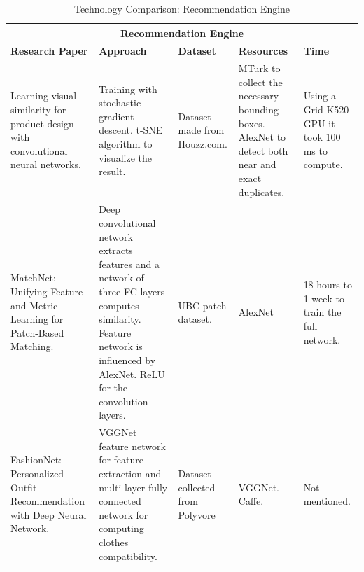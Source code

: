 \begin{table}[H]
\begin{tabular}{ @{}|p{3cm}|p{4cm}|p{2.5cm}|p{2.5cm}|p{2.5cm}|  }
 \hline
 \multicolumn{5}{|c|}{\textbf{Recommendation Engine}} \\
 \hline
 \textbf{Research Paper} & \textbf{Approach} & \textbf{Dataset} & \textbf{Resources} & \textbf{Time}\\
 \hline
 
  Learning visual similarity for product design with convolutional neural networks. & 
Training with stochastic gradient descent. t-SNE algorithm to visualize the result. & Dataset made from Houzz.com. & MTurk to collect the necessary bounding boxes. AlexNet to detect both near and exact duplicates. & Using a Grid K520 GPU it took 100 ms to compute.\\
\hline

MatchNet: Unifying Feature and Metric Learning for Patch-Based Matching. & Deep convolutional network extracts features and a network of three FC layers computes similarity. Feature network is influenced by AlexNet. ReLU for the convolution layers. & UBC patch dataset. & AlexNet & 18 hours to 1 week to train the full network.\\
  \hline
FashionNet: Personalized Outfit Recommendation with Deep Neural Network. & VGGNet feature network for feature extraction and multi-layer fully connected network for computing clothes compatibility. & Dataset collected from Polyvore & VGGNet. Caffe. & Not mentioned. \\
 \hline
 
\end{tabular}
\caption{Technology Comparison: Recommendation Engine}
\label{table:recommendation-engine 2}
\end{table}

